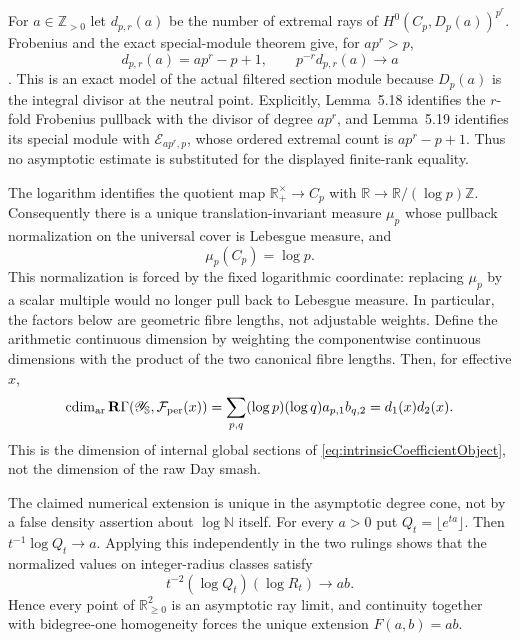 \documentclass[11pt]{amsart}
\theoremstyle{definition}
\theoremstyle{remark}
\newcommand{\R}{\mathbb R}
\newcommand{\Z}{\mathbb Z}
\begin{document}
For $a\in\Z_{>0}$ let $d_{p,r}(a)$ be the number of extremal rays of
$H^0(C_p,D_p(a))^{p^r}$.  Frobenius and the exact special-module theorem
give, for $ap^r>p$,
\begin{equation}\label{eq:periodicOneDimensionalLimit}
 d_{p,r}(a)=ap^r-p+1,
 \qquad p^{-r}d_{p,r}(a)\longrightarrow a
\end{equation}
\cite[Lemmas~5.18--5.19]{CC-ScalingSite}.  This is an exact model of the
actual filtered section module because $D_p(a)$ is the integral divisor at
the neutral point.  Explicitly, Lemma~5.18 identifies the $r$-fold
Frobenius pullback with the divisor of degree $ap^r$, and Lemma~5.19
identifies its special module with $\mathcal E_{ap^r,p}$, whose ordered
extremal count is $ap^r-p+1$.  Thus no asymptotic estimate is substituted
for the displayed finite-rank equality.

The logarithm identifies the quotient map
$\R_+^\times\to C_p$ with $\R\to\R/(\log p)\Z$.  Consequently there is a
unique translation-invariant measure $\mu_p$ whose pullback normalization
on the universal cover is Lebesgue measure, and
\begin{equation}\label{eq:canonicalPeriodicHaarLength}
 \mu_p(C_p)=\log p.
\end{equation}
This normalization is forced by the fixed logarithmic coordinate: replacing
$\mu_p$ by a scalar multiple would no longer pull back to Lebesgue measure.
In particular, the factors below are geometric fibre lengths, not adjustable
weights.  Define the arithmetic
continuous dimension by weighting the componentwise continuous dimensions
with the product of the two canonical fibre lengths.  Then, for effective
$x$,
\begin{equation}\label{eq:intrinsicContinuousDimension}
 \operatorname{cdim}_{\rm ar}\mathbf R\Gamma
    (\mathscr Y_{\mathbb S},\mathcal F_{\rm per}(x))
 =\sum_{p,q}(\log p)(\log q)a_{p,1}b_{q,2}
 =d_1(x)d_2(x).
\end{equation}
This is the dimension of internal global sections of
\eqref{eq:intrinsicCoefficientObject}, not the dimension of the raw Day
smash.

The claimed numerical extension is unique in the asymptotic degree cone,
not by a false density assertion about $\log\mathbb N$ itself.  For every
$a>0$ put $Q_t=\lfloor e^{ta}\rfloor$.  Then
$t^{-1}\log Q_t\to a$.  Applying this independently in the two rulings
shows that the normalized values on integer-radius classes satisfy
\[
 t^{-2}(\log Q_t)(\log R_t)\longrightarrow ab.
\]
Hence every point of $\R_{\geq0}^2$ is an asymptotic ray limit, and
continuity together with bidegree-one homogeneity forces the unique
extension $F(a,b)=ab$.
\end{document}
